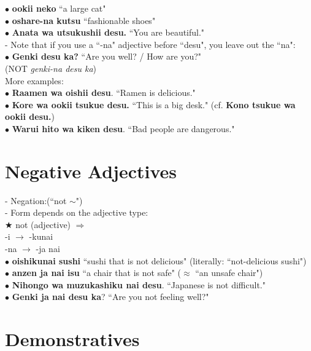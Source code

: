 \documentclass[11pt]{article} %
\newcommand{\ee}{\vspace{.10cm}\\} %
\begin{document}
$\bullet$ \textbf{ookii neko} ``a large cat"\\
$\bullet$ \textbf{oshare-na kutsu} ``fashionable shoes"\ee

$\bullet$ \textbf{Anata wa utsukushii desu.} ``You are beautiful."\\
- Note that if you use a ``-na" adjective before ``desu", you leave out the ``na":\\
$\bullet$ \textbf{Genki desu ka?} ``Are you well? / How are you?"\\ (NOT \textit{genki-na desu ka})\ee

More examples:\\
$\bullet$ \textbf{Raamen wa oishii desu}.  ``Ramen is delicious."\\
$\bullet$ \textbf{Kore wa ookii tsukue desu.} ``This is a big desk." (cf. \textbf{Kono tsukue wa ookii desu.})\\
$\bullet$ \textbf{Warui hito wa kiken desu}.  ``Bad people are dangerous."\ee

\section{Negative Adjectives}

- Negation:(``not $\sim$")\\
- Form depends on the adjective type:\ee

$\bigstar$ not (adjective) $\Rightarrow$\\
-i $\rightarrow$ -kunai \\
-na $\rightarrow$ -ja nai \ee

$\bullet$ \textbf{oishikunai sushi} ``sushi that is not delicious" (literally: ``not-delicious sushi")\\
$\bullet$ \textbf{anzen ja nai isu} ``a chair that is not safe" ($\approx$ ``an unsafe chair")\\
$\bullet$ \textbf{Nihongo wa muzukashiku nai desu}. ``Japanese is not difficult."\\
$\bullet$ \textbf{Genki ja nai desu ka}?  ``Are you not feeling well?"\\

\section{Demonstratives}
\end{document}
